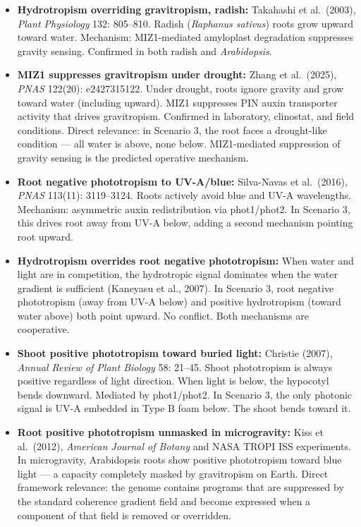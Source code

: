 \documentclass[10pt, a4paper]{article}
\begin{document}
\begin{itemize}[itemsep=0.2em]
  \item \textbf{Hydrotropism overriding gravitropism, radish:}
    Takahashi et al.\ (2003), \textit{Plant Physiology} 132:
    805--810.
    Radish (\textit{Raphanus sativus}) roots grow upward toward
    water. Mechanism: MIZ1-mediated amyloplast degradation
    suppresses gravity sensing. Confirmed in both radish
    and \textit{Arabidopsis}.

  \item \textbf{MIZ1 suppresses gravitropism under drought:}
    Zhang et al.\ (2025), \textit{PNAS} 122(20): e2427315122.
    Under drought, roots ignore gravity and grow toward water
    (including upward). MIZ1 suppresses PIN auxin transporter
    activity that drives gravitropism.
    Confirmed in laboratory, clinostat, and field conditions.
    Direct relevance: in Scenario 3, the root faces a
    drought-like condition --- all water is above, none below.
    MIZ1-mediated suppression of gravity sensing is
    the predicted operative mechanism.

  \item \textbf{Root negative phototropism to UV-A/blue:}
    Silva-Navas et al.\ (2016), \textit{PNAS} 113(11):
    3119--3124.
    Roots actively avoid blue and UV-A wavelengths.
    Mechanism: asymmetric auxin redistribution via phot1/phot2.
    In Scenario 3, this drives root away from UV-A below,
    adding a second mechanism pointing root upward.

  \item \textbf{Hydrotropism overrides root negative
    phototropism:}
    When water and light are in competition, the hydrotropic
    signal dominates when the water gradient is sufficient
    (Kaneyasu et al., 2007).
    In Scenario 3, root negative phototropism (away from
    UV-A below) and positive hydrotropism (toward water
    above) both point upward. No conflict. Both mechanisms
    are cooperative.

  \item \textbf{Shoot positive phototropism toward buried light:}
    Christie (2007), \textit{Annual Review of Plant Biology}
    58: 21--45.
    Shoot phototropism is always positive regardless of
    light direction. When light is below, the hypocotyl
    bends downward. Mediated by phot1/phot2.
    In Scenario 3, the only photonic signal is UV-A
    embedded in Type B foam below. The shoot bends toward it.

  \item \textbf{Root positive phototropism unmasked in
    microgravity:}
    Kiss et al.\ (2012), \textit{American Journal of Botany}
    and NASA TROPI ISS experiments.
    In microgravity, Arabidopsis roots show positive
    phototropism toward blue light --- a capacity completely
    masked by gravitropism on Earth.
    Direct framework relevance: the genome contains programs
    that are suppressed by the standard coherence gradient
    field and become expressed when a component of that
    field is removed or overridden.


\end{itemize}
\end{document}
